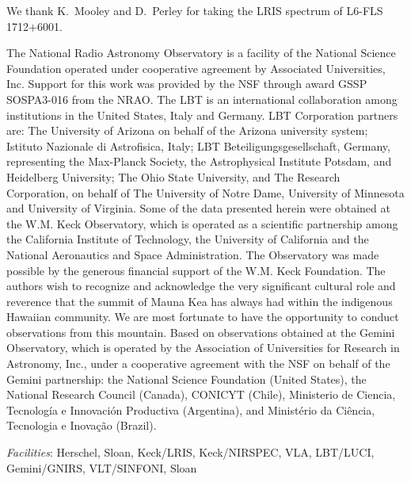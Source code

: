 \documentclass[iop,revtex4,twocolumn,apj,numberedappendix,appendixfloats]{emulateapj}
\begin{document}

\acknowledgments

We thank K.~Mooley and D.~Perley for taking the LRIS spectrum of L6-FLS\,1712$+$6001. 

The National Radio Astronomy Observatory is a facility of the National Science Foundation operated under cooperative agreement by Associated Universities, Inc. Support for this work was provided by the NSF through award GSSP SOSPA3-016 from the NRAO.
The LBT is an international collaboration among institutions in the United States, Italy and Germany. LBT Corporation partners are: The University of Arizona on behalf of the Arizona university system; Istituto Nazionale di Astrofisica, Italy; LBT Beteiligungsgesellschaft, Germany, representing the Max-Planck Society, the Astrophysical Institute Potsdam, and Heidelberg University; The Ohio State University, and The Research Corporation, on behalf of The University of Notre Dame, University of Minnesota and University of Virginia.
Some of the data presented herein were obtained at the W.M. Keck Observatory, which is operated as a scientific partnership among the California Institute of Technology, the University of California and the National Aeronautics and Space Administration. The Observatory was made possible by the generous financial support of the W.M. Keck Foundation.
The authors wish to recognize and acknowledge the very significant cultural role and reverence that the summit of Mauna Kea has always had within the indigenous Hawaiian community.  We are most fortunate to have the opportunity to conduct observations from this mountain.
Based on observations obtained at the Gemini Observatory, which is operated by the Association of Universities for Research in Astronomy, Inc., under a cooperative agreement with the NSF on behalf of the Gemini partnership: the National Science Foundation (United States), the National Research Council (Canada), CONICYT (Chile), Ministerio de Ciencia, Tecnolog\'{i}a e Innovaci\'{o}n Productiva (Argentina), and Minist\'{e}rio da Ci\^{e}ncia, Tecnologia e Inova\c{c}\~{a}o (Brazil).
 
{\it Facilities}: Herschel, Sloan, Keck/LRIS, Keck/NIRSPEC, VLA, LBT/LUCI, Gemini/GNIRS, VLT/SINFONI, Sloan
\end{document}
